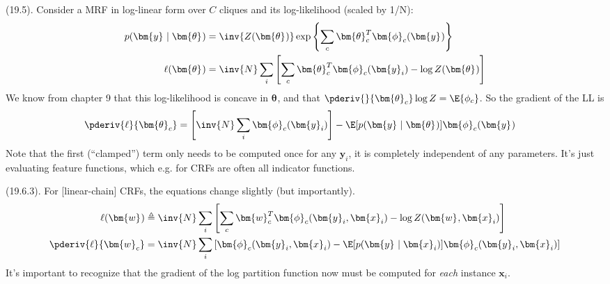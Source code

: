 \documentclass[11pt]{article}
\renewcommand\vec[2][]{\bm{#2}_{#1}}
\newcommand\myspace[1][]{\vspace{#1\bigskipamount}}
\newcommand\p{\Needspace{10\baselineskip} \noindent}
\begin{document}
\p {} (19.5). Consider a MRF in log-linear form over $C$ cliques and its log-likelihood (scaled by 1/N):
\begin{align}
	p(\vec y \mid \vec\theta)	
		&= \inv{Z(\vec\theta)} \exp\left\{ \sum_c \vec[c]{\theta}^T \vec[c]{\phi}(\vec y)  \right\} \\
	\ell(\vec\theta)
		&= \inv{N} \sum_i \left[ \sum_c  \vec[c]{\theta}^T \vec[c]{\phi}(\vec[i]{y}) - \log Z(\vec\theta)    \right]
\end{align}
We know from chapter 9 that this log-likelihood is concave in $\vec\theta$, and that $\pderiv{}{\vec[c]{\theta}} \log Z = \E{\phi_c}$. So the gradient of the LL is
\begin{align}
	\pderiv{\ell}{\vec[c]{\theta}} 
		&= \left[ \inv{N} \sum_i \vec[c]{\phi}(\vec[i]{y}) \right] - \E[p(\vec y \mid \vec\theta)]{\vec[c]{\phi}(\vec y)}
\end{align}
Note that the first (``clamped'') term only needs to be computed once for any $\vec[i]{y}$, it is completely independent of any parameters. It's just evaluating feature functions, which e.g. for CRFs are often all indicator functions.

\myspace
\p {} (19.6.3). For [linear-chain] CRFs, the equations change slightly (but importantly).
\begin{align}
	\ell(\vec w)
		&\triangleq \inv{N} \sum_i \left[ \sum_c \vec[c]{w}^T \vec[c]{\phi}(\vec[i]{y}, \vec[i]{x}) - \log Z(\vec w, \vec[i]{x}) \right] \\
	\pderiv{\ell}{\vec[c]{w}}
		&= \inv{N} \sum_i \left[
			\vec[c]{\phi}(\vec[i]{y}, \vec[i]{x}) 
		- \E[ p( \vec{y} \mid  \bm{x}_i ) ]{ \vec[c]{\phi}(\vec[i]{y}, \vec[i]{x}) }		
		\right]
\end{align}
It's important to recognize that the gradient of the log partition function now must be computed for \textit{each} instance $\vec[i]{x}$. 





\begin{comment}
\lecture{Machine Learning: A Probabilistic Perspective}{Variational Inference (Ch. 21)}{August 12, 2018}

\vspace{-1.7em}
{\scriptsize Kevin P. Murphy (2012). Variational Inference.\\ \textit{Machine Learning: A Probabilistic Perspective}.\\ }
\end{comment}
\end{document}
